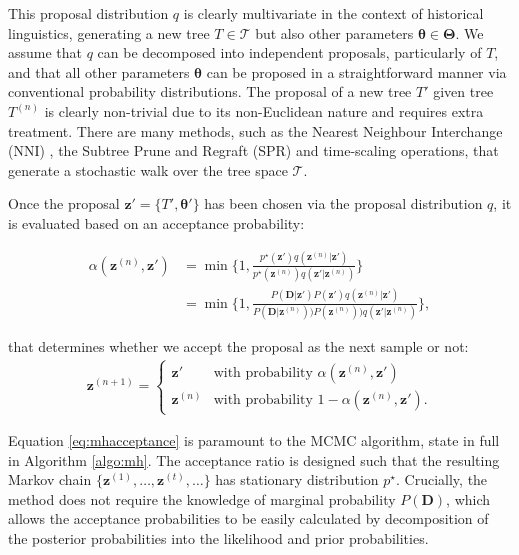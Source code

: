This proposal distribution $q$ is clearly multivariate in the context of historical linguistics, generating a new tree $T \in \mathcal{T}$ but also other parameters $\boldsymbol{\theta} \in \boldsymbol{\Theta}$. We assume that $q$ can be decomposed into independent proposals, particularly of $T$, and that all other parameters $\boldsymbol{\theta}$ can be proposed in a straightforward manner via conventional probability distributions. The proposal of a new tree $T'$ given tree $T^{(n)}$ is clearly non-trivial due to its non-Euclidean nature and requires extra treatment. There are many methods, such as the Nearest Neighbour Interchange (NNI) \cite{Li1996}, the Subtree Prune and Regraft (SPR) \cite{Hillis1996} and time-scaling operations, that generate a stochastic walk over the tree space $\mathcal{T}$. 

Once the proposal $\mathbf{z}' = \{ T', \boldsymbol{\theta}' \}$ has been chosen via the proposal distribution $q$, it is evaluated based on an acceptance probability:

\begin{align}
    \alpha(\mathbf{z}^{(n)}, \mathbf{z}') &= \min \Bigg\{1, \frac{p^\star(\mathbf{z}')q(\mathbf{z}^{(n)}|\mathbf{z}')}{p^\star(\mathbf{z}^{(n)})q(\mathbf{z}'|\mathbf{z}^{(n)})}\Bigg\} \\
    &= \min \Bigg\{1, \frac{P(\mathbf{D} | \mathbf{z}')P(\mathbf{z}')q(\mathbf{z}^{(n)}|\mathbf{z}')}{P(\mathbf{D} | \mathbf{z}^{(n)}))P(\mathbf{z}^{(n)}))q(\mathbf{z}'|\mathbf{z}^{(n)})}\Bigg\},\label{eq:mhacceptance}
\end{align}

that determines whether we accept the proposal as the next sample or not:
\begin{align}
    \mathbf{z}^{(n+1)} = \begin{cases}
        \mathbf{z}' & \text{with probability } \alpha(\mathbf{z}^{(n)}, \mathbf{z}') \\
        \mathbf{z}^{(n)} & \text{with probability } 1 - \alpha(\mathbf{z}^{(n)}, \mathbf{z}').
    \end{cases}
\end{align}

Equation \ref{eq:mhacceptance} is paramount to the MCMC algorithm, state in full in Algorithm \ref{algo:mh}. The acceptance ratio is designed such that the resulting Markov chain $\{\mathbf{z}^{(1)}, \dots, \mathbf{z}^{(t)}, \dots\}$ has stationary distribution $p^\star$\cite{Douc2019}. Crucially, the method does not require the knowledge of marginal probability $P(\mathbf{D})$, which allows the acceptance probabilities to be easily calculated by decomposition of the posterior probabilities into the likelihood and prior probabilities. 

